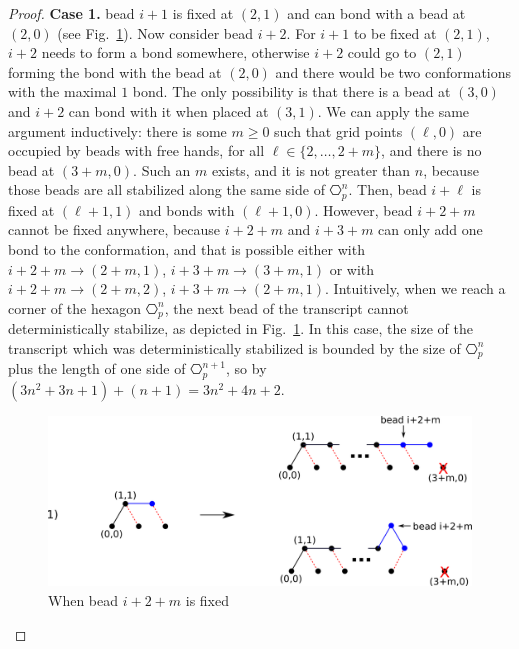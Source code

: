 \begin{proof}
\noindent\textbf{Case 1.} bead $i+1$ is fixed at $(2,1)$ and can bond with a bead at $(2,0)$ (see Fig.~\ref{fig:hexagonOut2}). Now consider bead $i+2$. For $i+1$ to be fixed at $(2,1)$, $i+2$ needs to form a bond somewhere, otherwise $i+2$ could go to $(2,1)$ forming the bond with the bead at $(2,0)$ and there would be two conformations with the maximal $1$ bond. The only possibility is that there is a bead at $(3,0)$ and $i+2$ can bond with it when placed at $(3,1)$. We can apply the same argument inductively: there is some $m\geq 0$ such that grid points $(\ell,0)$ are occupied by beads with free hands, for all $\ell\in \{2,\dots,2+m\}$, and there is no bead at $(3+m,0)$. Such an $m$ exists, and it is not greater than $n$, because those beads are all stabilized along the same side of $\hexagon_p^n$. Then, bead $i+\ell$ is fixed at $(\ell+1,1)$ and bonds with $(\ell+1,0)$. However, bead $i+2+m$ cannot be fixed anywhere, because $i+2+m$ and $i+3+m$ can only add one bond to the conformation, and that is possible either with $i+2+m \rightarrow (2+m,1)$, $i+3+m \rightarrow (3+m,1)$ or with $i+2+m \rightarrow (2+m,2)$, $i+3+m \rightarrow (2+m,1)$. Intuitively, when we reach a corner of the hexagon $\hexagon_p^n$, the next bead of the transcript cannot deterministically stabilize, as depicted in Fig.~\ref{fig:hexagonOut2}. In this case, the size of the transcript which was deterministically stabilized is bounded by the size of $\hexagon_p^n$ plus the length of one side of $\hexagon_p^{n+1}$, so by $(3n^2+3n+1)+(n+1)=3n^2+4n+2$.
	\begin{figure}[h]
		\centering
		\includegraphics[width=0.9\linewidth]{./Fig/hexagonOut2}
		\caption{When bead $i+2+m$ is fixed}
		\label{fig:hexagonOut2}
	\end{figure}

\vspace{0.2cm}
	

\end{proof}
